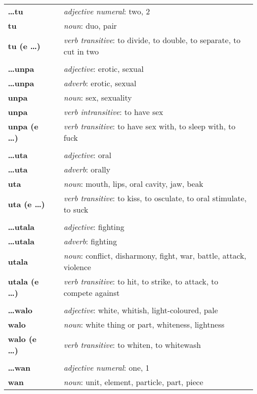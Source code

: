 \begin{supertabular}{p{2,5cm}|ll}
\textbf{\dots tu} && \textit{adjective numeral}: two, 2 \\ 
\textbf{tu} && \textit{noun}: duo, pair \\ 
\textbf{tu (e \dots)} && \textit{verb transitive}: to divide, to double, to separate, to cut in two \\ 
 && \\ %
\textbf{\dots unpa} && \textit{adjective}: erotic, sexual \\ 
\textbf{\dots unpa} && \textit{adverb}: erotic, sexual \\ 
\textbf{unpa} && \textit{noun}: sex, sexuality \\ 
\textbf{unpa} && \textit{verb intransitive}: to have sex \\ 
\textbf{unpa (e \dots)} && \textit{verb transitive}: to have sex with, to sleep with, to fuck \\ 
 && \\ %
\textbf{\dots uta} && \textit{adjective}: oral \\ 
\textbf{\dots uta} && \textit{adverb}: orally \\ 
\textbf{uta} && \textit{noun}: mouth, lips, oral cavity, jaw, beak \\ 
\textbf{uta (e \dots)} && \textit{verb transitive}: to kiss, to osculate, to oral stimulate, to suck \\ 
 && \\ %
\textbf{\dots utala} && \textit{adjective}: fighting \\ 
\textbf{\dots utala} && \textit{adverb}: fighting \\ 
\textbf{utala} && \textit{noun}: conflict, disharmony, fight, war, battle, attack, violence \\ 
\textbf{utala (e \dots)} && \textit{verb transitive}: to hit, to strike, to attack, to compete against \\ 
 && \\ %
\textbf{\dots walo} && \textit{adjective}: white, whitish, light-coloured, pale \\ 
\textbf{walo} && \textit{noun}: white thing or part, whiteness, lightness \\ 
\textbf{walo (e \dots)} && \textit{verb transitive}: to whiten, to whitewash \\ 
 && \\ %
\textbf{\dots wan} && \textit{adjective numeral}: one, 1 \\ 
\textbf{wan} && \textit{noun}: unit, element, particle, part, piece \\ 

\end{supertabular}
